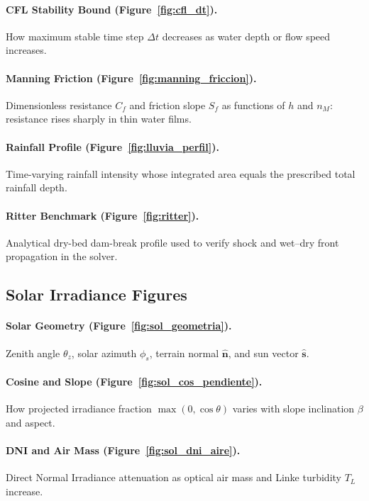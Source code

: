 \documentclass[11pt,a4paper]{article}
\begin{document}
\paragraph{CFL Stability Bound (Figure~\ref{fig:cfl_dt}).} How maximum stable time step $\Delta t$ decreases as water depth or flow speed increases.

\paragraph{Manning Friction (Figure~\ref{fig:manning_friccion}).} Dimensionless resistance $C_f$ and friction slope $S_f$ as functions of $h$ and $n_M$: resistance rises sharply in thin water films.

\paragraph{Rainfall Profile (Figure~\ref{fig:lluvia_perfil}).} Time-varying rainfall intensity whose integrated area equals the prescribed total rainfall depth.

\paragraph{Ritter Benchmark (Figure~\ref{fig:ritter}).} Analytical dry-bed dam-break profile used to verify shock and wet--dry front propagation in the solver.

\subsection*{Solar Irradiance Figures}

\paragraph{Solar Geometry (Figure~\ref{fig:sol_geometria}).} Zenith angle $\theta_z$, solar azimuth $\phi_s$, terrain normal $\hat{\mathbf{n}}$, and sun vector $\hat{\mathbf{s}}$.

\paragraph{Cosine and Slope (Figure~\ref{fig:sol_cos_pendiente}).} How projected irradiance fraction $\max(0,\cos\theta)$ varies with slope inclination $\beta$ and aspect.

\paragraph{DNI and Air Mass (Figure~\ref{fig:sol_dni_aire}).} Direct Normal Irradiance attenuation as optical air mass and Linke turbidity $T_L$ increase.
\end{document}
